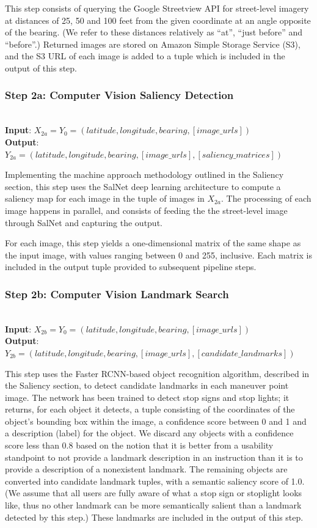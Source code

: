 This step consists of querying the Google Streetview API for street-level imagery at distances of 25, 50 and 100 feet from the given coordinate at an angle opposite of the bearing. (We refer to these distances relatively as “at”, “just before” and “before”.) Returned images are stored on Amazon Simple Storage Service (S3), and the S3 URL of each image is added to a tuple which is included in the output of this step. 

\subsubsection*{Step 2a: Computer Vision Saliency Detection}~\\
\noindent\textbf{Input}: $X_{2a} = Y_0 = (latitude, longitude, bearing, [image\_urls])$\\
\textbf{Output}: $Y_{2a} = (latitude, longitude, bearing, [image\_urls], [saliency\_matrices])$ 

Implementing the machine approach methodology outlined in the Saliency section, this step uses the SalNet deep learning architecture to compute a saliency map for each image in the tuple of images in $X_{2a}$. The processing of each image happens in parallel, and consists of feeding the the street-level image through SalNet and capturing the output.

For each image, this step yields a one-dimensional matrix of the same shape as the input image, with values ranging between 0 and 255, inclusive. Each matrix is included in the output tuple provided to subsequent pipeline steps.

\subsubsection*{Step 2b: Computer Vision Landmark Search}~\\
\noindent\textbf{Input}: $X_{2b} = Y_0 = (latitude, longitude, bearing, [image\_urls])$\\
\textbf{Output}: $Y_{2b} = (latitude, longitude, bearing,  [image\_urls], [candidate\_landmarks] )$ 

This step uses the Faster RCNN-based object recognition algorithm, described in the Saliency section, to detect candidate landmarks in each maneuver point image. The network has been trained to detect stop signs and stop lights; it returns, for each object it detects, a tuple consisting of the coordinates of the object’s bounding box within the image, a confidence score between 0 and 1 and a description (label) for the object. We discard any objects with a confidence score less than 0.8 based on the notion that it is better from a usability standpoint to not provide a landmark description in an instruction than it is to provide a description of a nonexistent landmark. The remaining objects are converted into candidate landmark tuples, with a semantic saliency score of 1.0. (We assume that all users are fully aware of what a stop sign or stoplight looks like, thus no other landmark can be more semantically salient than a landmark detected by this step.) These landmarks are included in the output of this step.


